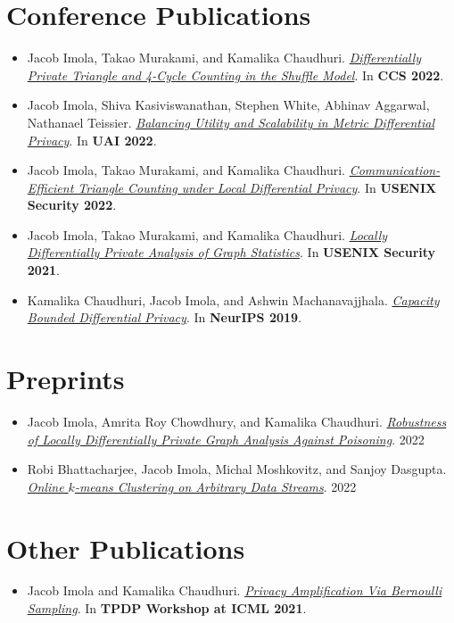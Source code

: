 \documentclass[11pt]{article}
\begin{document}
\section*{Conference Publications}
\begin{itemize}
	\setlength\itemsep{-0.3em}
	\item Jacob Imola, Takao Murakami, and Kamalika Chaudhuri.
		\textit{\href{https://arxiv.org/abs/2205.01429.pdf}{Differentially Private Triangle and 4-Cycle Counting in the Shuffle Model}}. In \textbf{CCS 2022}. 
	\item Jacob Imola, Shiva Kasiviswanathan, Stephen White, Abhinav Aggarwal, Nathanael Teissier.
		\textit{\href{https://openreview.net/pdf?id=B0l8-wLjql5}{Balancing Utility and Scalability in Metric Differential Privacy}}. In \textbf{UAI 2022}.
	\item 
		Jacob Imola, Takao Murakami, and Kamalika Chaudhuri.
		\textit{\href{https://arxiv.org/abs/2110.06485}{Communication-Efficient Triangle Counting under Local Differential Privacy}}. In \textbf{USENIX Security 2022}.
	\item 
		Jacob Imola, Takao Murakami, and Kamalika Chaudhuri.
		\textit{\href{https://arxiv.org/abs/2010.08688}{Locally Differentially Private Analysis of Graph Statistics}}. In \textbf{USENIX Security 2021}.
	\item
		Kamalika Chaudhuri, Jacob Imola, and Ashwin Machanavajjhala.
		\textit{\href{https://arxiv.org/abs/1907.02159}{Capacity Bounded Differential Privacy}}.
	  In \textbf{NeurIPS 2019}.
\end{itemize}

\section*{Preprints}
\begin{itemize}
	\setlength\itemsep{-0.3em}
	\item
		Jacob Imola, Amrita Roy Chowdhury, and Kamalika Chaudhuri.
		\textit{\href{https://arxiv.org/pdf/2210.14376.pdf}{Robustness of Locally Differentially Private Graph Analysis Against Poisoning}}. 2022
	\item 
		Robi Bhattacharjee, Jacob Imola, Michal Moshkovitz, and Sanjoy Dasgupta.
		\textit{\href{https://arxiv.org/abs/2102.09101}{Online $k$-means Clustering on Arbitrary Data Streams}}. 2022
\end{itemize}

\section*{Other Publications}
\begin{itemize}
	\setlength\itemsep{-0.3em}
	\item
		Jacob Imola and Kamalika Chaudhuri.
		\textit{\href{https://arxiv.org/abs/2105.10594}{Privacy Amplification Via Bernoulli Sampling}}. In \textbf{TPDP Workshop at ICML 2021}.
\end{itemize}
\end{document}
